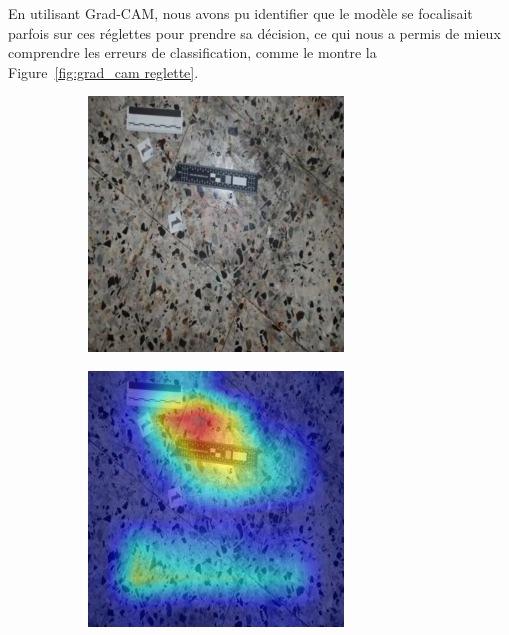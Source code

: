 En utilisant Grad-CAM, nous avons pu identifier que le modèle se focalisait parfois sur ces réglettes pour prendre sa décision, ce qui nous a permis de mieux comprendre les erreurs de classification, comme le montre la Figure~\ref{fig:grad_cam reglette}.

\begin{figure}[ht]
    \centering
    \begin{subfigure}{0.35\linewidth}
        \centering
        \includegraphics[width=\linewidth]{../asset/exemple/attention_reglette_image.jpg}
    \end{subfigure}
    \begin{subfigure}{0.35\linewidth}
        \centering
        \includegraphics[width=\linewidth]{../asset/exemple/attention_reglette.jpg}

\end{subfigure}
\end{figure}
